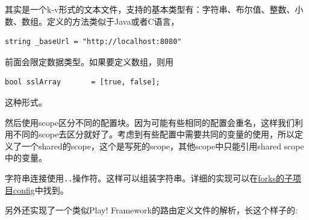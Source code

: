 \documentclass[12pt]{article}
\begin{document}
其实是一个k-v形式的文本文件，支持的基本类型有：字符串、布尔值、整数、小数、数组。定义的方法类似于Java或者C语言，

\begin{verbatim}
string _baseUrl = "http://localhost:8080"
\end{verbatim}

前面会限定数据类型。如果要定义数组，则用

\begin{verbatim}
bool sslArray       = [true, false];
\end{verbatim}

这种形式。

然后使用scope区分不同的配置块。因为可能有些相同的配置会重名，这样我们利用不同的scope去区分就好了。考虑到有些配置中需要共同的变量的使用，所以定义了一个shared的scope，这个是写死的scope，其他scope中只能引用shared scope中的变量。

字符串连接使用\texttt{..}操作符。这样可以组装字符串。详细的实现可以在\href{https://github.com/soleverlee/forks/tree/master/config/src/main}{forks的子项目config}中找到。

另外还实现了一个类似Play! Framework的路由定义文件的解析，长这个样子的:
\end{document}
